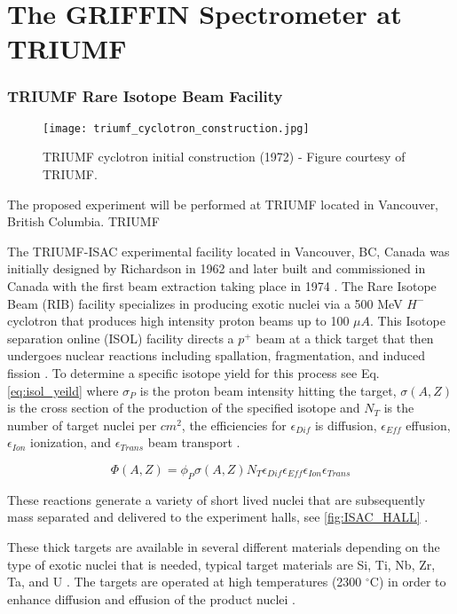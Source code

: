 \documentclass[cnatzke_thesis_proposal.tex]{subfiles}
\begin{document}
\chapter{The GRIFFIN Spectrometer at TRIUMF}
\subsection{TRIUMF Rare Isotope Beam Facility}
\begin{figure}[H]
  \begin{center}
    \texttt{[image: triumf\_cyclotron\_construction.jpg]}
  \end{center}
  \caption{TRIUMF cyclotron initial construction (1972) - Figure courtesy of TRIUMF.}
  \label{fig:TRIUMF_CYCLOTRON}
\end{figure}

The proposed experiment will be performed at TRIUMF located in Vancouver, British Columbia. TRIUMF 


The TRIUMF-ISAC experimental facility located in Vancouver, BC, Canada was initially designed by Richardson in 1962 and later built and commissioned in Canada with the first beam extraction taking place in 1974 \cite{Bylinskii2014}. The Rare Isotope Beam (RIB) facility specializes in producing exotic nuclei via a 500 MeV $H^{-}$ cyclotron that produces high intensity proton beams up to 100 $\mu A$.  This Isotope separation online (ISOL) facility directs a $p^+$ beam at a thick target that then undergoes nuclear reactions including spallation, fragmentation, and induced fission \cite{Bricault2014}.  To determine a specific isotope yield for this process see Eq.\ref{eq:isol_yeild} where $\sigma_P$ is the proton beam intensity hitting the target, $\sigma(A, Z)$ is the cross section of the production of the specified isotope and $N_T$ is the number of target nuclei per $cm^2$, the efficiencies for $\epsilon_{Dif}$ is diffusion, $\epsilon_{Eff}$ effusion,  $\epsilon_{Ion}$ ionization, and $\epsilon_{Trans}$ beam transport \cite{Bricault2014}.

\begin{equation}
  \Phi(A,Z) = \phi_P \sigma(A,Z) N_T \epsilon_{Dif} \epsilon_{Eff} \epsilon_{Ion} \epsilon_{Trans}
  \label{eq:isol_yeild}
\end{equation}

These reactions generate a variety of short lived nuclei that are subsequently mass separated and delivered to the experiment halls, see \ref{fig:ISAC_HALL} \cite{Dombsky2014}.

These thick targets are available in several different materials depending on the type of exotic nuclei that is needed, typical target materials are Si, Ti, Nb, Zr, Ta, and U \cite{Dilling2014}.  The targets are operated at high temperatures (2300 $^{\circ}$C) in order to enhance diffusion and effusion of the product nuclei \cite{Dombsky2014}.
\end{document}
